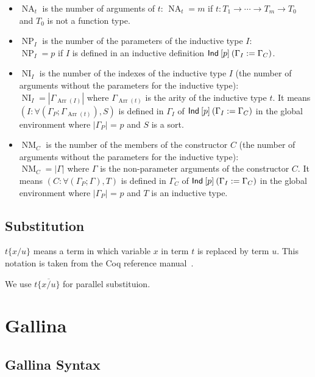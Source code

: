 \documentclass[a4paper,fleqn]{article}
\def\gallina{\textrm{Gallina}}
\DeclareMathOperator{\NA}{NA} %
\DeclareMathOperator{\NP}{NP} %
\DeclareMathOperator{\NI}{NI} %
\DeclareMathOperator{\NM}{NM} %
\DeclareMathOperator{\Arr}{Arr} %
\newcommand{\arr}[1]{\Gamma_{\Arr(#1)}}
\newcommand{\subst}[3]{#1\{#2/#3\}}
\newcommand{\substm}[3]{#1\{\overline{#2/#3}\}}
\begin{document}
\begin{itemize}
  \item $\NA_t$ is the number of arguments of $t$: \quad $\NA_t=m$ if $t : T_1 \rightarrow \dotsb \rightarrow T_m \rightarrow T_0$ and $T_0$ is not a function type.
  \item $\NP_I$ is the number of the parameters of the inductive type $I$: \\
    $\NP_I=p$ if $I$ is defined in an inductive definition $\text{\sf Ind}\:[p]\:(\Gamma_I := \Gamma_C)$.
  \item $\NI_I$ is the number of the indexes of the inductive type $I$ (the number of arguments without the parameters for the inductive type): \\
    $\NI_I=|\arr{I}|$ where
    $\arr{t}$ is the arity of the inductive type $t$.
    It means $(I : \forall (\Gamma_P; \arr{t}), S)$ is defined in $\Gamma_I$ of $\text{\sf Ind}\:[p]\:(\Gamma_I := \Gamma_C)$ in the global environment where
    $|\Gamma_P|$ = $p$ and $S$ is a sort.
  \item $\NM_C$ is the number of the members of the constructor $C$ (the number of arguments without the parameters for the inductive type): \\
    $\NM_C=|\Gamma|$ where
    $\Gamma$ is the non-parameter arguments of the constructor $C$.
    It means $(C : \forall (\Gamma_P; \Gamma), T)$ is defined in $\Gamma_C$ of $\text{\sf Ind}\:[p]\:(\Gamma_I := \Gamma_C)$ in the global environment where
    $|\Gamma_P|$ = $p$ and $T$ is an inductive type.
\end{itemize}

\subsection{Substitution}
$\subst{t}{x}{u}$ means a term in which variable $x$ in term $t$ is replaced by term $u$.
This notation is taken from the Coq reference manual~\cite{coqrefman8.12.0}.

We use $\substm{t}{x}{u}$ for parallel substituion.

\section{\gallina{}}\label{sec:gallina}
\subsection{\gallina{} Syntax}\label{sec:gallina-syntax}
\end{document}
